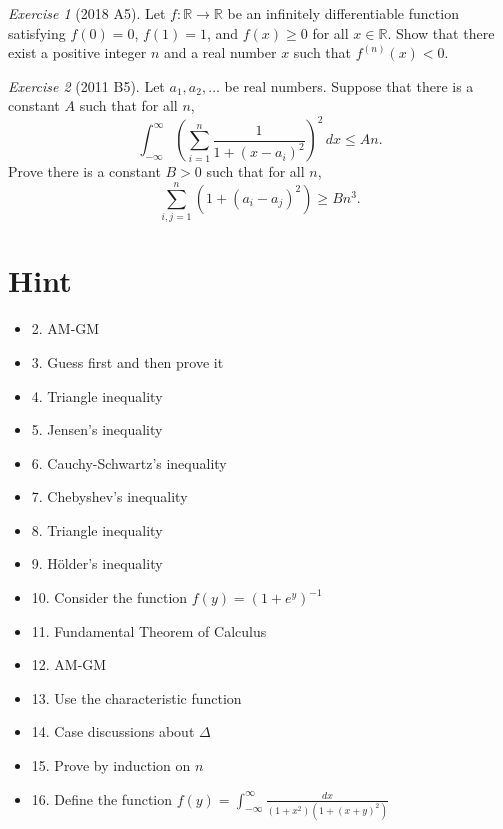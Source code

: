 \documentclass{article}
\theoremstyle{definition}
\theoremstyle{remark}
\newtheorem{exercise}{Exercise}
\begin{document}
\begin{exercise}[2018 A5]
Let $f: \mathbb{R} \to \mathbb{R}$ be an infinitely differentiable function satisfying $f(0) = 0$, $f(1)= 1$,
and $f(x) \geq 0$ for all $x \in \mathbb{R}$. Show that there exist a positive integer $n$ and a real number $x$
such that $f^{(n)}(x) < 0$.
\end{exercise}


\begin{exercise}[2011 B5]
Let $a_1, a_2, \dots$ be real numbers. Suppose that there is
a constant $A$ such that for all $n$,
\[
\int_{-\infty}^\infty \left( \sum_{i=1}^n \frac{1}{1 + (x-a_i)^2} \right)^2\,dx \leq An.
\]
Prove there is a constant $B>0$ such that for all $n$,
\[
\sum_{i,j=1}^n (1 + (a_i - a_j)^2) \geq Bn^3.
\]
\end{exercise}

\newpage
\section{Hint}
\begin{itemize}
    \item 2. AM-GM
    \item 3. Guess first and then prove it
    \item 4. Triangle inequality
    \item 5. Jensen's inequality 
    \item 6. Cauchy-Schwartz's inequality
    \item 7. Chebyshev's inequality
    \item 8. Triangle inequality 
    \item 9. H\"older's inequality 
    \item 10. Consider the function $f(y) = (1 + e^{y})^{-1}$
    \item 11. Fundamental Theorem of Calculus
    \item 12. AM-GM
    \item 13. Use the characteristic function
    \item 14. Case discussions about $\Delta$
    \item 15. Prove by induction on $n$
    \item 16. Define the function $f(y) = \int_{-\infty}^{\infty} \frac{dx}{(1 + x^{2})(1 + (x + y)^{2})}$
\end{itemize}
\end{document}
